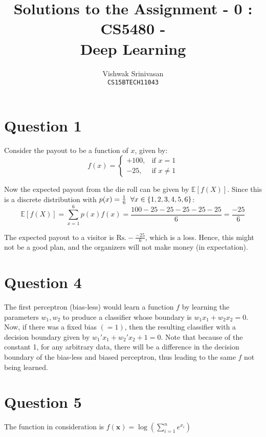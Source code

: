 \documentclass{article}
\title{Solutions to the Assignment - 0 : CS5480 - \\
Deep Learning}
\author{Vishwak Srinivasan\\
\texttt{CS15BTECH11043}}
\date{}
\begin{document}
\maketitle

\section*{Question 1}
\begin{flushleft}
Consider the payout to be a function of \(x\), given by:
\begin{equation}
f(x) = \begin{cases} +100, & \text{if } x = 1 \\ -25, & \text{if } x \neq 1 \end{cases}
\end{equation}

Now the expected payout from the die roll can be given by \(\mathbb{E}[f(X)]\). Since this is a discrete distribution with \(p(x) = \frac{1}{6} \hspace{2mm} \forall x \in \{1, 2, 3, 4, 5, 6\}\):
\begin{equation}
\displaystyle \mathbb{E}[f(X)] = \sum_{x=1}^{6} p(x)f(x) = \frac{100 - 25 - 25 - 25 - 25 - 25}{6} = \frac{-25}{6}
\end{equation}

The expected payout to a visitor is \(\boxed{\text{Rs.} -\frac{-25}{6}}\), which is a loss. Hence, this might not be a good plan, and the organizers will not make money (in expectation).
\end{flushleft}

\section*{Question 4}
\begin{flushleft}
The first perceptron (bias-less) would learn a function \(f\) by learning the parameters \(w_1, w_2\) to produce a classifier whose boundary is \(w_1 x_1 + w_2 x_2 = 0\). Now, if there was a fixed bias \(( = 1)\), then the resulting classifier with a decision boundary given by \(w_1' x_1 + w_2' x_2 + 1 = 0\). Note that because of the constant 1, for any arbitrary data, there will be a difference in the decision boundary of the bias-less and biased perceptron, thus leading to the same \(f\) not being learned.
\end{flushleft}

\section*{Question 5}
The function in consideration is \(f(\mathbf{x}) = \displaystyle \log\left(\sum_{i=1}^{n} e^{x_i}\right)\)
\end{document}
